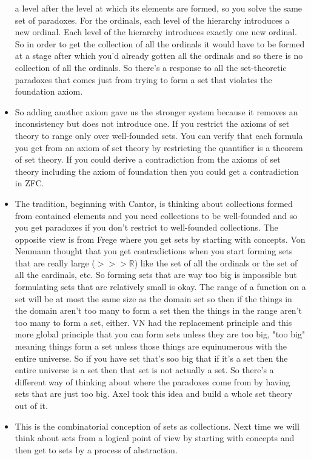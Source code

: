 \documentclass[12pt]{article}
\theoremstyle{definition}
\begin{document}
\begin{itemize}
        a level after the level at which its elements are formed, so you solve
        the same set of paradoxes. For the ordinals, each level of the
        hierarchy introduces a new ordinal. Each level of the hierarchy
        introduces exactly one new ordinal. So in order to get the collection
        of all the ordinals it would have to be formed at a stage after which
        you'd already gotten all the ordinals and so there is no collection of
        all the ordinals. So there's a response to all the set-theoretic
        paradoxes that comes just from trying to form a set that violates the
        foundation axiom. 
    \item
        So adding another axiom gave us the stronger system because it removes
        an inconsistency but does not introduce one. If you restrict the axioms
        of set theory to range only over well-founded sets. You can verify that
        each formula you get from an axiom of set theory by restricting the
        quantifier is a theorem of set theory. If you could derive a
        contradiction from the axioms of set theory including the axiom of
        foundation then you could get a contradiction in ZFC.
    \item
        The tradition, beginning with Cantor, is thinking about collections
        formed from contained elements and you need collections to be
        well-founded and so you get paradoxes if you don't restrict to
        well-founded collections. The opposite view is from Frege where you get
        sets by starting with concepts. Von Neumann thought that you get
        contradictions when you start forming sets that are really large ($>>>
        \mathbb{R}$) like the set of all the ordinals or the set of all the
        cardinals, etc. So forming sets that are way too big is impossible but
        formulating sets that are relatively small is okay. The range of a
        function on a set will be at most the same size as the domain set so
        then if the things in the domain aren't too many to form a set then the
        things in the range aren't too many to form a set, either. VN had the
        replacement principle and this more global principle that you can form
        sets unless they are too big, "too big" meaning things form a set
        unless those things are equinumerous with the entire universe. So if
        you have set that's soo big that if it's a set then the entire universe
        is a set then that set is not actually a set. So there's a different
        way of thinking about where the paradoxes come from by having sets that
        are just too big. Axel took this idea and build a whole set theory out
        of it. 
    \item
        This is the combinatorial conception of sets as collections. Next time
        we will think about sets from a logical point of view by starting with
        concepts and then get to sets by a process of abstraction.

\end{itemize}
\end{document}
